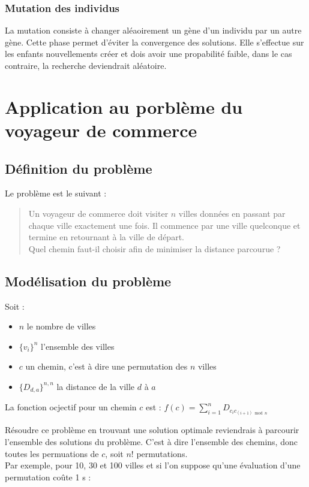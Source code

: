 \documentclass{article}
\begin{document}
        \subsubsection{Mutation des individus}
        La mutation consiste à changer aléaoirement un gène d'un individu par un autre gène. Cette phase permet d'éviter la convergence des solutions. Elle s'effectue sur les enfants nouvellements créer et dois avoir une propabilité faible, dans le cas contraire, la recherche deviendrait aléatoire.

\section{Application au porblème du voyageur de commerce}
	\subsection{Définition du problème}
	Le problème est le suivant : 
	\begin{quote}
	Un voyageur de commerce doit visiter $n$ villes données en passant par chaque ville exactement une fois. Il commence par une ville quelconque et termine en retournant à la ville de départ.\\
	Quel chemin faut-il choisir afin de minimiser la distance parcourue ?
	\end{quote}
	
	\subsection{Modélisation du problème}
    Soit :
    \begin{itemize}
        \item $n$ le nombre de villes
        \item $\{v_i\}^{n}$ l'ensemble des villes
        \item $c$ un chemin, c'est à dire une permutation des $n$ villes
        \item $\{D_{d, a}\}^{n, n}$ la distance de la ville $d$ à $a$
    \end{itemize}
    La fonction ocjectif pour un chemin $c$ est : $f(c) = \sum_{i=1}^{n}D_{ c_i c_{(i+1) \bmod n } }$

	Résoudre ce problème en trouvant une solution optimale reviendrais à parcourir l'ensemble des solutions du problème. C'est à dire l'ensemble des chemins, donc toutes les permuations de $c$, soit $n!$ permutations. \\
	Par exemple, pour 10, 30 et 100 villes et si l'on suppose qu'une évaluation d'une permutation coûte 1 \micro s : \\
\end{document}
